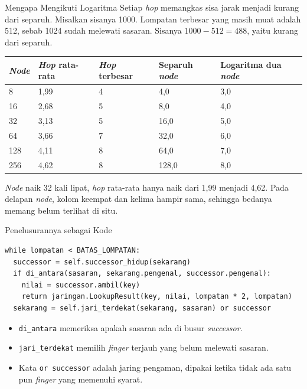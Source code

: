 \documentclass[aspectratio=169, table, 12pt]{beamer}
\begin{document}
\begin{frame}{{\Large Mengapa Mengikuti Logaritma}}
  \vspace{4pt}
  {\small Setiap \textit{hop} memangkas sisa jarak menjadi kurang dari separuh.
  Misalkan sisanya 1000. Lompatan terbesar yang masih muat adalah 512, sebab
  1024 sudah melewati sasaran. Sisanya $1000 - 512 = 488$, yaitu kurang dari
  separuh.}
  \vspace{5pt}
  \centering
  \scriptsize
  \begin{tabularx}{0.95\textwidth}{|l|l|l|l|X|}
    \hline
    \textbf{\textit{Node}} & \textbf{\textit{Hop} rata-rata} & \textbf{\textit{Hop} terbesar} & \textbf{Separuh \textit{node}} & \textbf{Logaritma dua \textit{node}} \\
    \hline
    8 & 1,99 & 4 & 4,0 & 3,0 \\
    \hline
    16 & 2,68 & 5 & 8,0 & 4,0 \\
    \hline
    32 & 3,13 & 5 & 16,0 & 5,0 \\
    \hline
    64 & 3,66 & 7 & 32,0 & 6,0 \\
    \hline
    128 & 4,11 & 8 & 64,0 & 7,0 \\
    \hline
    256 & 4,62 & 8 & 128,0 & 8,0 \\
    \hline
  \end{tabularx}

  \vspace{5pt}
  {\footnotesize \textit{Node} naik 32 kali lipat, \textit{hop} rata-rata hanya
  naik dari 1,99 menjadi 4,62. Pada delapan \textit{node}, kolom keempat dan
  kelima hampir sama, sehingga bedanya memang belum terlihat di situ.}
\end{frame}

\begin{frame}[fragile]{{\Large Penelusurannya sebagai Kode}}
  \vspace{10pt}
\begin{lstlisting}[style=PythonStyle]
while lompatan < BATAS_LOMPATAN:
  successor = self.successor_hidup(sekarang)
  if di_antara(sasaran, sekarang.pengenal, successor.pengenal):
    nilai = successor.ambil(key)
    return jaringan.LookupResult(key, nilai, lompatan * 2, lompatan)
  sekarang = self.jari_terdekat(sekarang, sasaran) or successor
\end{lstlisting}

  \vspace{8pt}
  \begin{itemize}\small
    \item \texttt{di\_antara} memeriksa apakah sasaran ada di busur \textit{successor}.
    \item \texttt{jari\_terdekat} memilih \textit{finger} terjauh yang belum melewati
          sasaran.
    \item Kata \texttt{or successor} adalah jaring pengaman, dipakai ketika tidak
          ada satu pun \textit{finger} yang memenuhi syarat.
  \end{itemize}
\end{frame}
\end{document}
